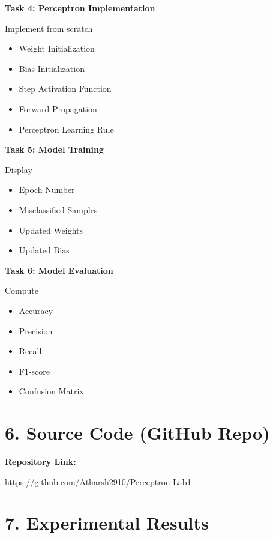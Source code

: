 \documentclass[11pt]{article}
\begin{document}
\vspace{2mm}

\textbf{Task 4: Perceptron Implementation}

Implement from scratch

\begin{itemize}
\item Weight Initialization
\item Bias Initialization
\item Step Activation Function
\item Forward Propagation
\item Perceptron Learning Rule
\end{itemize}

\vspace{2mm}

\textbf{Task 5: Model Training}

Display

\begin{itemize}
\item Epoch Number
\item Misclassified Samples
\item Updated Weights
\item Updated Bias
\end{itemize}

\vspace{2mm}

\textbf{Task 6: Model Evaluation}

Compute

\begin{itemize}
\item Accuracy
\item Precision
\item Recall
\item F1-score
\item Confusion Matrix
\end{itemize}

\section*{6. Source Code (GitHub Repo)}
\textbf{Repository Link:}

\url{https://github.com/Atharsh2910/Perceptron-Lab1}

\section*{7. Experimental Results}
\end{document}
